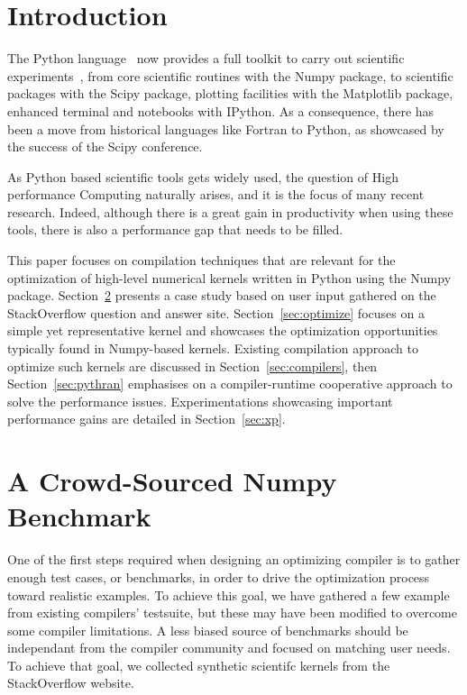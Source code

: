 \documentclass[10pt, preprint]{sigplanconf}
\begin{document}
\section{Introduction}

The Python language~\cite{rossum97} now provides a full toolkit to carry out
scientific experiments~\cite{scipy}, from core scientific routines with the
Numpy package\cite{oliphant2007,numpyarray2011}, to scientific packages with
the Scipy package, plotting facilities with the Matplotlib package, enhanced
terminal and notebooks with IPython. As a consequence, there has been a move
from historical languages like Fortran to Python, as showcased by the success
of the Scipy conference.

As Python based scientific tools gets widely used, the question of High
performance Computing naturally arises, and it is the focus of many recent
research. Indeed, although there is a great gain in productivity when using
these tools, there is also a performance gap that needs to be filled.

This paper focuses on compilation techniques that are relevant for the
optimization of high-level numerical kernels written in Python using the Numpy
package. Section~\ref{sec:stackoverflow} presents a case study based on user
input gathered on the StackOverflow question and answer site.
Section~\ref{sec:optimize} focuses on a simple yet representative kernel and
showcases the optimization opportunities typically found in Numpy-based
kernels. Existing compilation approach to optimize such kernels are discussed
in Section~\ref{sec:compilers}, then Section~\ref{sec:pythran} emphasises on a
compiler-runtime cooperative approach to solve the performance issues.
Experimentations showcasing important performance gains are detailed in
Section~\ref{sec:xp}.


\section{A Crowd-Sourced Numpy Benchmark}
\label{sec:stackoverflow}

One of the first steps required when designing an optimizing compiler is to
gather enough test cases, or benchmarks, in order to drive the optimization
process toward realistic examples. To achieve this goal, we have gathered a few
example from existing compilers' testsuite, but these may have been modified to
overcome some compiler limitations. A less biased source of benchmarks should
be independant from the compiler community and focused on matching user needs.
To achieve that goal, we collected synthetic scientifc kernels from the
StackOverflow website.
\end{document}
